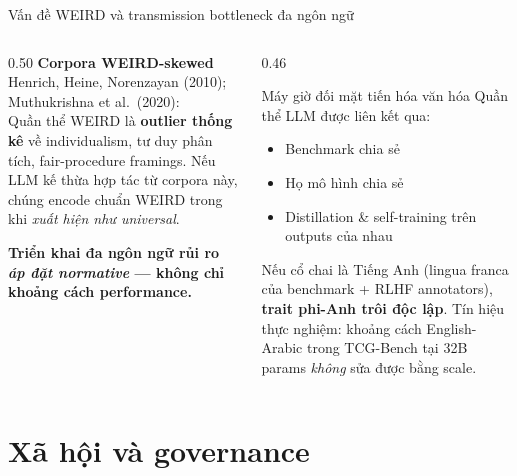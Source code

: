 \documentclass[11pt,aspectratio=169]{beamer}
\newcommand{\takeaway}[1]{%
  \begin{center}
    \colorbox{rsnavy!10}{%
      \begin{minipage}{0.92\textwidth}
        \centering\textbf{#1}
      \end{minipage}}
  \end{center}}
\begin{document}
\begin{frame}{Vấn đề WEIRD và transmission bottleneck đa ngôn ngữ}
    \large
    \begin{columns}[T]
        \begin{column}{0.50\textwidth}
            \textbf{Corpora WEIRD-skewed}\\
            \footnotesize Henrich, Heine, Norenzayan (2010); Muthukrishna et al.\ (2020):\\[4pt]
            \normalsize Quần thể WEIRD là \textbf{outlier thống kê} về individualism, tư duy phân tích, fair-procedure framings.
            \vspace{0.3cm}
            Nếu LLM kế thừa hợp tác từ corpora này, chúng encode chuẩn WEIRD trong khi \emph{xuất hiện như universal}.
            \vspace{0.3cm}
            \takeaway{Triển khai đa ngôn ngữ rủi ro \emph{áp đặt normative} --- không chỉ khoảng cách performance.}
        \end{column}
        \begin{column}{0.46\textwidth}
            \begin{alertblock}{Máy giờ đối mặt tiến hóa văn hóa}
                \footnotesize Quần thể LLM được liên kết qua:
                \begin{itemize}
                    \item Benchmark chia sẻ
                    \item Họ mô hình chia sẻ
                    \item Distillation \& self-training trên outputs của nhau
                \end{itemize}
                \vspace{0.2cm}
                Nếu cổ chai là Tiếng Anh (lingua franca của benchmark + RLHF annotators), \textbf{trait phi-Anh trôi độc lập}.
                \vspace{0.2cm}
                Tín hiệu thực nghiệm: khoảng cách English-Arabic trong TCG-Bench tại 32B params \emph{không} sửa được bằng scale.
            \end{alertblock}
        \end{column}
    \end{columns}
\end{frame}

\section{Xã hội và governance}
\end{document}
